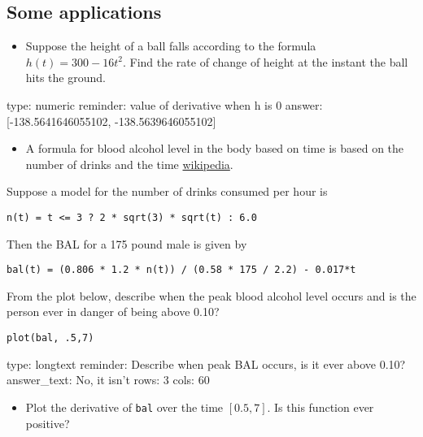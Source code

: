 \documentclass[12pt]{article}
\begin{document}
\subsection{Some applications}

\begin{itemize}
\itemsep1pt\parskip0pt
\item
  Suppose the height of a ball falls according to the formula
  $h(t) =   300 - 16t^2$. Find the rate of change of height at the
  instant the ball hits the ground.
\end{itemize}

\begin{answer}
    type: numeric
    reminder: value of derivative when h is 0
    answer: [-138.5641646055102, -138.5639646055102]

\end{answer}

\begin{itemize}
\itemsep1pt\parskip0pt
\item
  A formula for blood alcohol level in the body based on time is based
  on the number of drinks and the time
  \href{http://en.wikipedia.org/wiki/Blood_alcohol_content}{wikipedia}.
\end{itemize}

Suppose a model for the number of drinks consumed per hour is



\begin{verbatim}
n(t) = t <= 3 ? 2 * sqrt(3) * sqrt(t) : 6.0
\end{verbatim}
Then the BAL for a 175 pound male is given by



\begin{verbatim}
bal(t) = (0.806 * 1.2 * n(t)) / (0.58 * 175 / 2.2) - 0.017*t
\end{verbatim}
From the plot below, describe when the peak blood alcohol level occurs
and is the person ever in danger of being above 0.10?



\begin{verbatim}
plot(bal, .5,7)
\end{verbatim}
\begin{answer}
type: longtext
reminder: Describe when peak BAL occurs, is it ever above 0.10?
answer_text: No, it isn't 
rows: 3
cols: 60
\end{answer}

\begin{itemize}
\itemsep1pt\parskip0pt
\item
  Plot the derivative of \texttt{bal} over the time $[0.5, 7]$. Is this
  function ever positive?
\end{itemize}
\end{document}
